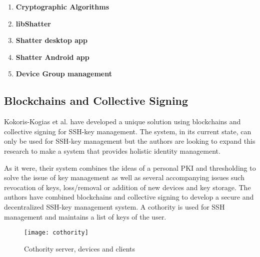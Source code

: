 \begin{enumerate}[label=\arabic*., wide, labelwidth=!, labelindent=0pt]
	\item \textbf{Cryptographic Algorithms}
	\item \textbf{libShatter}
	\item \textbf{Shatter desktop app}
	\item\textbf{Shatter Android app}
	\item \textbf{Device Group management}
\end{enumerate}
	



 

\subsection{Blockchains and Collective Signing}
Kokoris-Kogias et al.\cite{Kokoris-kogias} have developed a unique solution using blockchains and collective signing for SSH-key management. The system, in its current state, can only be used for SSH-key management but the authors are looking to expand this research to make a system that provides holistic identity management.

As it were, their system combines the ideas of a personal PKI and thresholding to solve the issue of key management as well as several accompanying issues such revocation of keys, loss/removal or addition of new devices and key storage. The authors have combined blockchains and collective signing to develop a secure and decentralized SSH-key management system. A cothority\cite{Syta} is used for SSH management and maintains a list of keys of the user.

\begin{figure}[h]
			\centering
			\texttt{[image: cothority]}
			\caption{Cothority server, devices and clients \cite{Kokoris-kogias}}
			\label{fig:cotho}
		\end{figure}
		
